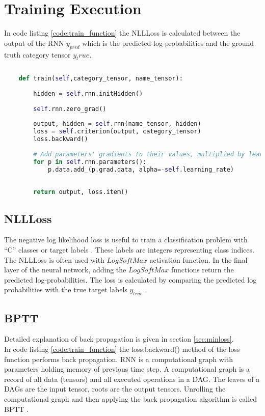 \clearpage

\section{Training Execution}

In code listing \ref{code:train_function} the \acl{NLLLoss} is calculated between the output of the \acf{RNN} $ y_{pred} $ which is the predicted-log-probabilities and the ground truth category tensor $y_true$.

\begin{lstlisting}[language=Python,caption={Train function},label={code:train_function}]
    
    def train(self,category_tensor, name_tensor):
        
        hidden = self.rnn.initHidden()
    
        self.rnn.zero_grad()
            
        output, hidden = self.rnn(name_tensor, hidden)
        loss = self.criterion(output, category_tensor)
        loss.backward()
       
        # Add parameters' gradients to their values, multiplied by learning rate
        for p in self.rnn.parameters():
            p.data.add_(p.grad.data, alpha=-self.learning_rate)
    
    
        return output, loss.item()
    \end{lstlisting}

\subsection{\acl{NLLLoss}} 
The negative log likelihood loss is useful to train a classification problem with ``C'' classes or target labels \parencite{Paszke.03122019}. These labels are integers representing class indices. The \acl{NLLLoss} is often used with $LogSoftMax$ activation function. In the final layer of the neural network, adding the 
$LogSoftMax$ functions return the predicted log-probabilities. The loss is calculated by comparing the predicted log probabilities with the true target labels $y_{true}$. 






\subsection{\acf{BPTT}}

Detailed explanation of back propagation is given in section \ref{sec:minloss}. \\ In code listing \ref{code:train_function} the loss.backward() method of the loss function performs back propagation. RNN is a computational graph with parameters holding memory of previous time step. A computational graph is a record of all data (tensors) and all executed operations in a \acf{DAG}. The leaves of a \acsp{DAG} are the input tensor, roots are the output tensors. Unrolling the computational graph and then applying the back propagation algorithm is called \acl{BPTT} \parencite[section 15.2.5]{pml1Book}.

